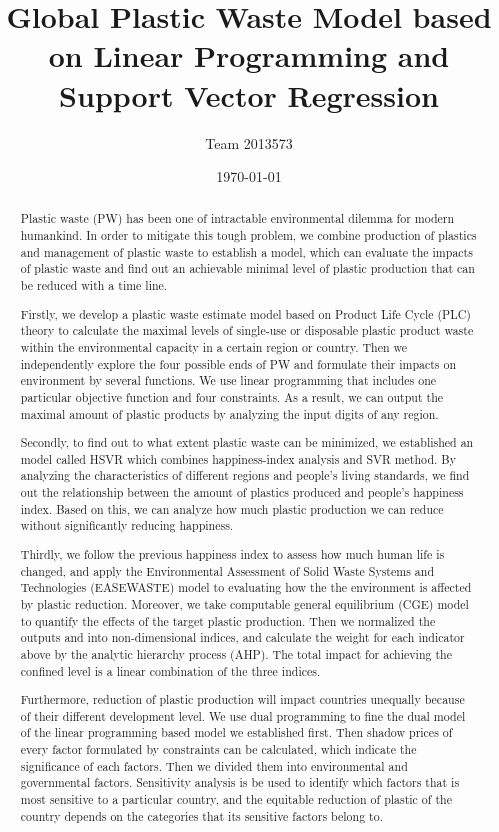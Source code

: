 \documentclass{mcmthesis}
\title{Global Plastic Waste Model based on Linear Programming and Support Vector Regression}
\author{Team 2013573}
\date{\today}
\begin{document}
\begin{abstract}

Plastic waste (PW) has been one of intractable environmental dilemma for modern humankind. In order to mitigate this tough problem, we combine production of plastics and management of plastic waste to establish a model, which can evaluate the impacts of plastic waste and find out an achievable minimal level of plastic production that can be reduced with a time line.  

Firstly, we develop a plastic waste estimate model based on Product Life Cycle (PLC) theory to calculate the maximal levels of single-use or disposable plastic product waste within the environmental capacity in a certain region or country. Then we independently explore the four possible ends of PW and formulate their impacts on environment by several functions. We use linear programming that includes one particular objective function and four constraints. As a result, we can output the maximal amount of plastic products by analyzing the input digits of any region. 

Secondly, to find out to what extent plastic waste can be minimized, we established an model called HSVR which combines happiness-index analysis and SVR method. By analyzing the characteristics of different regions and people’s living standards, we find out the relationship between the amount of plastics produced and people’s happiness index. Based on this, we can analyze how much plastic production we can reduce without significantly reducing happiness.

Thirdly, we follow the previous happiness index to assess how much human life is changed, and apply the Environmental Assessment of Solid Waste Systems and Technologies (EASEWASTE) model to evaluating how the the environment is affected by plastic reduction. Moreover, we take computable general equilibrium (CGE) model to quantify the effects of the target plastic production. Then we normalized the outputs and into non-dimensional indices, and calculate the weight for each indicator above by the analytic hierarchy process (AHP). The total impact for achieving the confined level is a linear combination of the three indices. 

Furthermore, reduction of plastic production will impact countries unequally because of their different development level. We use dual programming to fine the dual model of the linear programming based model we established first. Then shadow prices of every factor formulated by constraints can be calculated, which indicate the significance of each factors. Then we divided them into environmental and governmental factors. Sensitivity analysis is be used to identify which factors that is most sensitive to a particular country, and the equitable reduction of plastic of the country depends on the categories that its sensitive factors belong to. 


\end{abstract}
\end{document}
